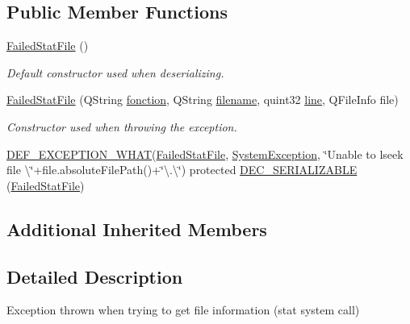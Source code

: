 \subsection*{Public Member Functions}
\begin{DoxyCompactItemize}
\item 
\hyperlink{class_gost_crypt_1_1_failed_stat_file_af7d8cea5c9c77c192fd543df1d41511b}{Failed\+Stat\+File} ()
\begin{DoxyCompactList}\small\item\em Default constructor used when deserializing. \end{DoxyCompactList}\item 
\hyperlink{class_gost_crypt_1_1_failed_stat_file_ae5c894049b1a7240dee5140e6e87f9c5}{Failed\+Stat\+File} (Q\+String \hyperlink{class_gost_crypt_1_1_gost_crypt_exception_a29b8c93d5efbb1ff369107385725a939}{fonction}, Q\+String \hyperlink{class_gost_crypt_1_1_gost_crypt_exception_a749a12375f4ba9d502623b99d8252f38}{filename}, quint32 \hyperlink{class_gost_crypt_1_1_gost_crypt_exception_abf506d911f12a4e969eea500f90bd32c}{line}, Q\+File\+Info file)
\begin{DoxyCompactList}\small\item\em Constructor used when throwing the exception. \end{DoxyCompactList}\item 
\hyperlink{_gost_crypt_exception_8h_a5bc1e1c6c9d6f46c84eeba49e33355f9}{D\+E\+F\+\_\+\+E\+X\+C\+E\+P\+T\+I\+O\+N\+\_\+\+W\+H\+AT}(\hyperlink{class_gost_crypt_1_1_failed_stat_file}{Failed\+Stat\+File}, \hyperlink{class_gost_crypt_1_1_system_exception}{System\+Exception}, \char`\"{}Unable to lseek file \textbackslash{}\char`\"{}+file.\+absolute\+File\+Path()+\char`\"{}\textbackslash{}.\textbackslash{}\char`\"{}) protected \hyperlink{class_gost_crypt_1_1_failed_stat_file_a462bfae48dcd832816b58a224e08a1b4}{D\+E\+C\+\_\+\+S\+E\+R\+I\+A\+L\+I\+Z\+A\+B\+LE} (\hyperlink{class_gost_crypt_1_1_failed_stat_file}{Failed\+Stat\+File})
\end{DoxyCompactItemize}
\subsection*{Additional Inherited Members}


\subsection{Detailed Description}
Exception thrown when trying to get file information (stat system call) 

